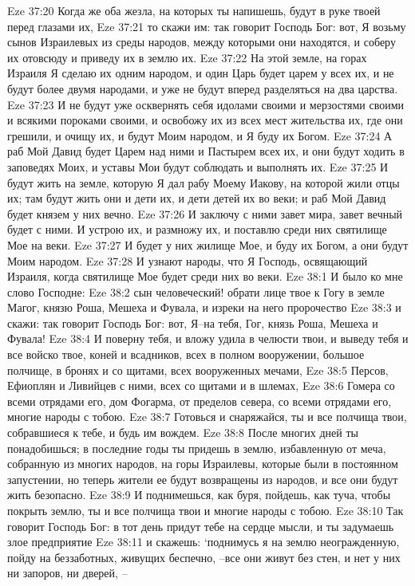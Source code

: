 Eze 37:20  Когда же оба жезла, на которых ты напишешь, будут в руке твоей перед глазами их,
Eze 37:21  то скажи им: так говорит Господь Бог: вот, Я возьму сынов Израилевых из среды народов, между которыми они находятся, и соберу их отовсюду и приведу их в землю их.
Eze 37:22  На этой земле, на горах Израиля Я сделаю их одним народом, и один Царь будет царем у всех их, и не будут более двумя народами, и уже не будут вперед разделяться на два царства.
Eze 37:23  И не будут уже осквернять себя идолами своими и мерзостями своими и всякими пороками своими, и освобожу их из всех мест жительства их, где они грешили, и очищу их, и будут Моим народом, и Я буду их Богом.
Eze 37:24  А раб Мой Давид будет Царем над ними и Пастырем всех их, и они будут ходить в заповедях Моих, и уставы Мои будут соблюдать и выполнять их.
Eze 37:25  И будут жить на земле, которую Я дал рабу Моему Иакову, на которой жили отцы их; там будут жить они и дети их, и дети детей их во веки; и раб Мой Давид будет князем у них вечно.
Eze 37:26  И заключу с ними завет мира, завет вечный будет с ними. И устрою их, и размножу их, и поставлю среди них святилище Мое на веки.
Eze 37:27  И будет у них жилище Мое, и буду их Богом, а они будут Моим народом.
Eze 37:28  И узнают народы, что Я Господь, освящающий Израиля, когда святилище Мое будет среди них во веки.
Eze 38:1  И было ко мне слово Господне:
Eze 38:2  сын человеческий! обрати лице твое к Гогу в земле Магог, князю Роша, Мешеха и Фувала, и изреки на него пророчество
Eze 38:3  и скажи: так говорит Господь Бог: вот, Я--на тебя, Гог, князь Роша, Мешеха и Фувала!
Eze 38:4  И поверну тебя, и вложу удила в челюсти твои, и выведу тебя и все войско твое, коней и всадников, всех в полном вооружении, большое полчище, в бронях и со щитами, всех вооруженных мечами,
Eze 38:5  Персов, Ефиоплян и Ливийцев с ними, всех со щитами и в шлемах,
Eze 38:6  Гомера со всеми отрядами его, дом Фогарма, от пределов севера, со всеми отрядами его, многие народы с тобою.
Eze 38:7  Готовься и снаряжайся, ты и все полчища твои, собравшиеся к тебе, и будь им вождем.
Eze 38:8  После многих дней ты понадобишься; в последние годы ты придешь в землю, избавленную от меча, собранную из многих народов, на горы Израилевы, которые были в постоянном запустении, но теперь жители ее будут возвращены из народов, и все они будут жить безопасно.
Eze 38:9  И поднимешься, как буря, пойдешь, как туча, чтобы покрыть землю, ты и все полчища твои и многие народы с тобою.
Eze 38:10  Так говорит Господь Бог: в тот день придут тебе на сердце мысли, и ты задумаешь злое предприятие
Eze 38:11  и скажешь: `поднимусь я на землю неогражденную, пойду на беззаботных, живущих беспечно, --все они живут без стен, и нет у них ни запоров, ни дверей, --
